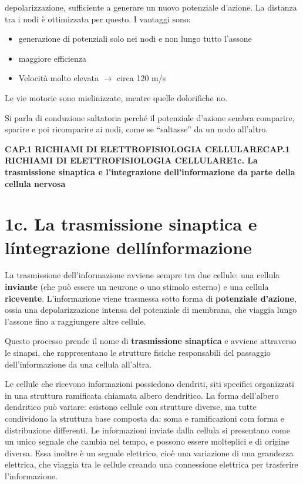 \documentclass[12pt,a4paper,openany]{book}
\begin{document}
depolarizzazione, sufficiente a generare un nuovo potenziale d'azione. La distanza tra i nodi è ottimizzata per questo. I vantaggi sono:

\begin{itemize}
  \item generazione di potenziali solo nei nodi e non lungo tutto l'assone
  \item maggiore efficienza
  \item Velocità molto elevata $\rightarrow$ circa 120 m/s
\end{itemize}
Le vie motorie sono mielinizzate, mentre quelle dolorifiche no.

Si parla di conduzione saltatoria perché il potenziale d'azione sembra comparire, sparire e poi ricomparire ai nodi, come se ``saltasse'' da un nodo all'altro.

\textbf{CAP.1 RICHIAMI DI ELETTROFISIOLOGIA CELLULARECAP.1 RICHIAMI DI ELETTROFISIOLOGIA CELLULARE1c. La trasmissione sinaptica e l'integrazione dell'informazione da parte della cellula nervosa}

\section{1c. La trasmissione sinaptica e l\'integrazione dell\'informazione}

La trasmissione dell'informazione avviene sempre tra due cellule: una cellula \textbf{inviante }(che può essere un neurone o uno stimolo esterno) e una cellula \textbf{ricevente}. L'informazione viene trasmessa sotto forma di \textbf{potenziale d'azione}, ossia una depolarizzazione intensa del potenziale di membrana, che viaggia lungo l'assone fino a raggiungere altre cellule.

Questo processo prende il nome di \textbf{trasmissione sinaptica }e avviene attraverso le sinapsi, che rappresentano le strutture fisiche responsabili del passaggio dell'informazione da una cellula all'altra.

Le cellule che ricevono informazioni possiedono dendriti, siti specifici organizzati in una struttura ramificata chiamata albero dendritico. La forma dell'albero dendritico può variare: esistono cellule con strutture diverse, ma tutte condividono la struttura base composta da: soma e ramificazioni com forma e distribuzione differenti. Le informazioni inviate dalla cellula si presentano come un unico segnale che cambia nel tempo, e possono essere molteplici e di origine diversa. Essa inoltre è un segnale elettrico, cioè una variazione di una grandezza elettrica, che viaggia tra le cellule creando una connessione elettrica per trasferire l'informazione.
\end{document}

